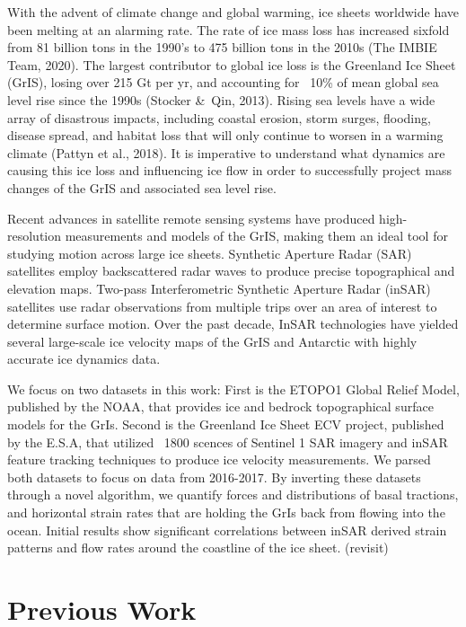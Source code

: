 \documentclass{article}
\begin{document}
With the advent of climate change and global warming, ice sheets worldwide have been melting at an alarming rate. The rate of ice mass loss has increased sixfold from 81 billion tons in the 1990’s to 475 billion tons in the 2010s (The IMBIE Team, 2020). The largest contributor to global ice loss is the Greenland Ice Sheet (GrIS), losing over 215 Gt per yr, and accounting for ~10\% of mean global sea level rise since the 1990s (Stocker \&\ Qin, 2013). Rising sea levels have a wide array of disastrous impacts, including coastal erosion, storm surges, flooding, disease spread, and habitat loss that will only continue to worsen in a warming climate (Pattyn et al., 2018). It is imperative to understand what dynamics are causing this ice loss and influencing ice flow in order to successfully project mass changes of the GrIS and associated sea level rise.

Recent advances in satellite remote sensing systems have produced high-resolution measurements and models of the GrIS, making them an ideal tool for studying motion across large ice sheets. Synthetic Aperture Radar (SAR) satellites employ backscattered radar waves to produce precise topographical and elevation maps. Two-pass Interferometric Synthetic Aperture Radar (inSAR) satellites use radar observations from multiple trips over an area of interest to determine surface motion. Over the past decade, InSAR technologies have yielded several large-scale ice velocity maps of the GrIS and Antarctic with highly accurate ice dynamics data. 

We focus on two datasets in this work: First is the ETOPO1 Global Relief Model, published by the NOAA, that provides ice and bedrock topographical surface models for the GrIs. Second is the Greenland Ice Sheet ECV project, published by the E.S.A, that utilized ~1800 scences of Sentinel 1 SAR imagery and inSAR feature tracking techniques to produce ice velocity measurements. We parsed both datasets to focus on data from 2016-2017. By inverting these datasets through a novel algorithm, we quantify forces and distributions of basal tractions, and horizontal strain rates that are holding the GrIs back from flowing into the ocean. Initial results show significant correlations between inSAR derived strain patterns and flow rates around the coastline of the ice sheet. (revisit)

\section{Previous Work}
\end{document}
